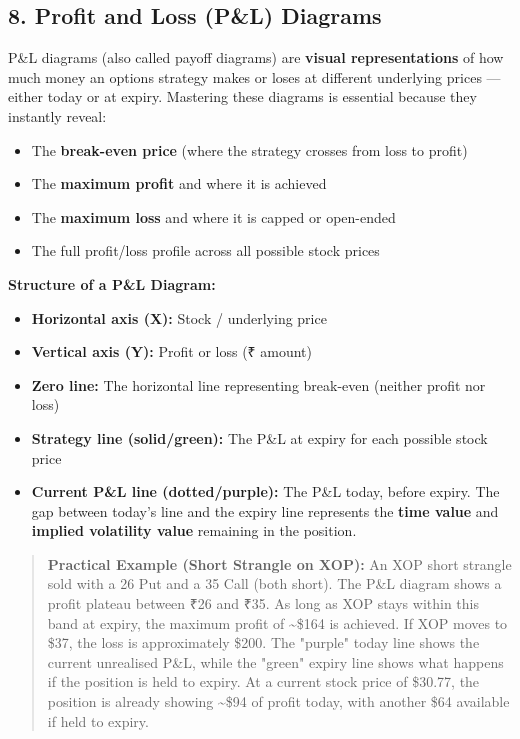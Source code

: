 \documentclass[12pt,openany]{book}
\begin{document}
\subsection{8. Profit and Loss (P\&L) Diagrams}

P\&L diagrams (also called payoff diagrams) are \textbf{visual representations} of how much money an options strategy makes or loses at different underlying prices — either today or at expiry. Mastering these diagrams is essential because they instantly reveal:

\begin{itemize}[leftmargin=*]
    \item The \textbf{break-even price} (where the strategy crosses from loss to profit)
    \item The \textbf{maximum profit} and where it is achieved
    \item The \textbf{maximum loss} and where it is capped or open-ended
    \item The full profit/loss profile across all possible stock prices
\end{itemize}

\textbf{Structure of a P\&L Diagram:}
\begin{itemize}[leftmargin=*]
    \item \textbf{Horizontal axis (X):} Stock / underlying price
    \item \textbf{Vertical axis (Y):} Profit or loss (₹ amount)
    \item \textbf{Zero line:} The horizontal line representing break-even (neither profit nor loss)
    \item \textbf{Strategy line (solid/green):} The P\&L at expiry for each possible stock price
    \item \textbf{Current P\&L line (dotted/purple):} The P\&L today, before expiry. The gap between today's line and the expiry line represents the \textbf{time value} and \textbf{implied volatility value} remaining in the position.
\end{itemize}

\begin{quote}
\textbf{Practical Example (Short Strangle on XOP):} An XOP short strangle sold with a 26 Put and a 35 Call (both short). The P\&L diagram shows a profit plateau between ₹26 and ₹35. As long as XOP stays within this band at expiry, the maximum profit of \textasciitilde{}\$164 is achieved. If XOP moves to \$37, the loss is approximately \$200. The "purple" today line shows the current unrealised P\&L, while the "green" expiry line shows what happens if the position is held to expiry. At a current stock price of \$30.77, the position is already showing \textasciitilde{}\$94 of profit today, with another \$64 available if held to expiry.
\end{quote}
\end{document}

